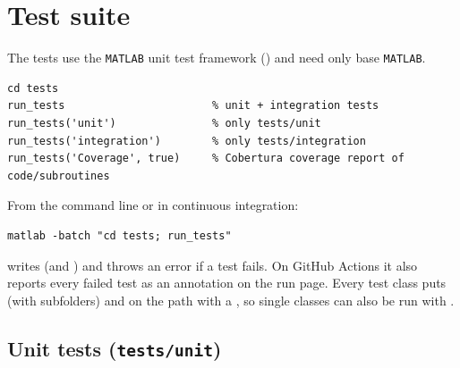 \chapter{Test suite}
\label{ch:testing}

The tests use the \texttt{MATLAB} unit test framework () and need
only base \texttt{MATLAB}.
\begin{lstlisting}
cd tests
run_tests                       % unit + integration tests
run_tests('unit')               % only tests/unit
run_tests('integration')        % only tests/integration
run_tests('Coverage', true)     % Cobertura coverage report of code/subroutines
\end{lstlisting}
From the command line or in continuous integration:
\begin{lstlisting}[style=shell]
matlab -batch "cd tests; run_tests"
\end{lstlisting}
 writes  (and )
and throws an error if a test fails. On GitHub Actions it also reports every
failed test as an annotation on the run page. Every test class puts
 (with subfolders) and  on the path with a
, so single classes can also be run with .

\section{Unit tests (\texorpdfstring{\texttt{tests/unit}}{tests/unit})}

